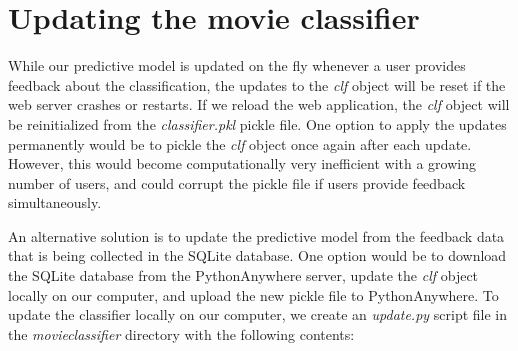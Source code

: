\documentclass[11pt]{article}
\begin{document}
    \section{Updating the movie
classifier}\label{updating-the-movie-classifier}

    While our predictive model is updated on the fly whenever a user
provides feedback about the classification, the updates to the
\emph{clf} object will be reset if the web server crashes or restarts.
If we reload the web application, the \emph{clf} object will be
reinitialized from the \emph{classifier.pkl} pickle file. One option to
apply the updates permanently would be to pickle the \emph{clf} object
once again after each update. However, this would become computationally
very inefficient with a growing number of users, and could corrupt the
pickle file if users provide feedback simultaneously.

An alternative solution is to update the predictive model from the
feedback data that is being collected in the SQLite database. One option
would be to download the SQLite database from the PythonAnywhere server,
update the \emph{clf} object locally on our computer, and upload the new
pickle file to PythonAnywhere. To update the classifier locally on our
computer, we create an \emph{update.py} script file in the
\emph{movieclassifier} directory with the following contents:
\end{document}
